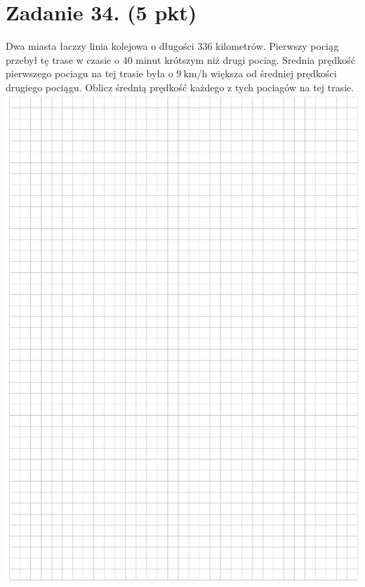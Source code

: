 \documentclass[10pt]{article}
\begin{document}
\section*{Zadanie 34. (5 pkt)}
Dwa miasta łaczzy linia kolejowa o długości 336 kilometrów. Pierwszy pociąg przebył tę trase w czasie o 40 minut krótszym niż drugi pociag. Srednia prędkość pierwszego pociagu na tej trasie była o \(9 \mathrm{~km} / \mathrm{h}\) większa od średniej prędkości drugiego pociągu. Oblicz średnią prędkość każdego z tych pociagów na tej trasie.\\
\includegraphics[max width=\textwidth, center]{2024_11_21_e0e8aab895018a50a9a7g-20}\\
\end{document}
